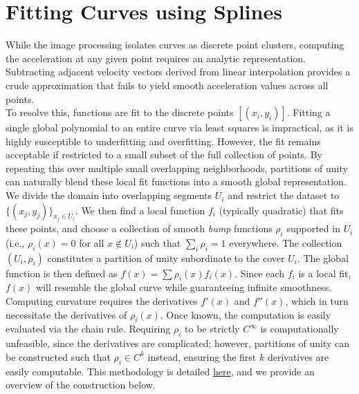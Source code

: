 \documentclass{article}
\begin{document}
\section{Fitting Curves using Splines}\label{sec.fit}
While the image processing isolates curves as discrete point clusters, computing the acceleration at any given point requires an analytic representation. Subtracting adjacent velocity vectors derived from linear interpolation provides a crude approximation that fails to yield smooth acceleration values across all points. \\

To resolve this, functions are fit to the discrete points $[(x_i, y_i)]$. Fitting a single global polynomial to an entire curve via least squares is impractical, as it is highly susceptible to underfitting and overfitting. However, the fit remains acceptable if restricted to a small subset of the full collection of points. By repeating this over multiple small overlapping neighborhoods,
partitions of unity can naturally blend these local fit functions into a smooth global representation. \\

We divide the domain into overlapping segments $U_i$ and restrict the dataset to $\{(x_j, y_j)\}_{x_j \in U_i}$. We then find a local function $f_i$ (typically quadratic) that fits these points, and choose a collection of smooth 
\emph{bump} functions $\rho_i$ supported in $U_i$ (i.e., $\rho_i(x) = 0$ for all $x \notin U_i$) such that $\sum_{i} \rho_i = 1$ everywhere. The collection $(U_i, \rho_i)$ constitutes a partition of unity subordinate to the cover $U_i$. The global function is then defined as $f(x) = \sum \rho_i(x) f_i(x)$. Since each $f_i$ is a local fit, $f(x)$ will resemble the global curve while guaranteeing infinite smoothness. \\

Computing curvature requires the derivatives $f'(x)$ and $f''(x)$, which in turn necessitate the derivatives of $\rho_i(x)$. Once known, the computation is easily evaluated via the chain rule. 
Requiring $\rho_i$ to be strictly $C^\infty$ is computationally unfeasible, since the derivatives are complicated; however, partitions of unity can be constructed such that $\rho_i \in C^k$ instead, ensuring the first
$k$ derivatives are easily computable. This methodology is detailed \href{https://personal.math.vt.edu/embree/math5466/lecture10.pdf}{here}, and we provide an overview of the construction below. \\
\end{document}

